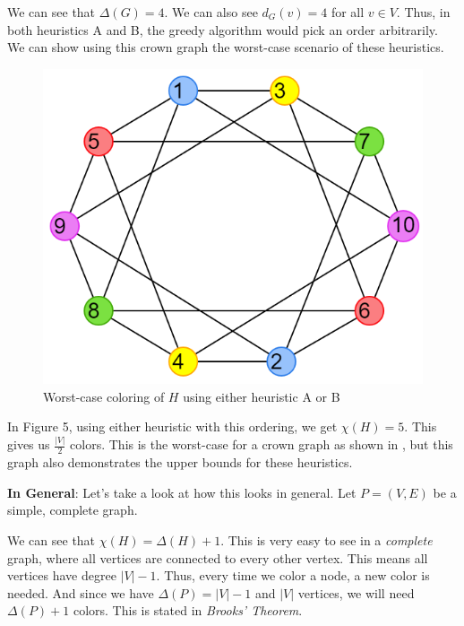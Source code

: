 \documentclass{article}
\theoremstyle{definition}
\begin{document}
We can see that \(\Delta(G) = 4\). We can also see \(d_G(v) = 4\) for all \(v \in V\). Thus, in both heuristics A and B, the greedy algorithm would pick an order arbitrarily. We can show using this crown graph the worst-case scenario of these heuristics.

\begin{figure}[H]
\centering
\includegraphics[scale=0.38]{images/graph-5.png}
\caption{Worst-case coloring of \(H\) using either heuristic A or B}
\end{figure}

In Figure 5, using either heuristic with this ordering, we get \(\chi(H) = 5\). This gives us \(\frac{|V|}{2}\) colors. This is the worst-case for a crown graph as shown in \cite{johnson}, but this graph also demonstrates the upper bounds for these heuristics. \newline

\textbf{In General}: Let's take a look at how this looks in general. Let \(P = (V, E)\) be a simple, complete graph. \newline

We can see that \(\chi(H) = \Delta(H) + 1\). This is very easy to see in a \emph{complete} graph, where all vertices are connected to every other vertex. This means all vertices have degree \(|V| - 1\). Thus, every time we color a node, a new color is needed. And since we have \(\Delta(P) = |V| - 1\) and \(|V|\) vertices, we will need \(\Delta(P) + 1\) colors. This is stated in \emph{Brooks' Theorem}.
\end{document}
